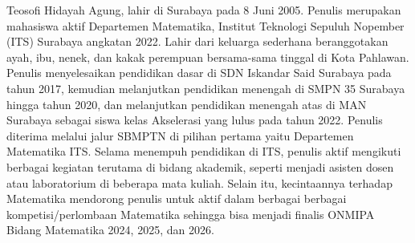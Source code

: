 Teosofi Hidayah Agung, lahir di Surabaya pada 8 Juni 2005. Penulis merupakan mahasiswa aktif Departemen Matematika, Institut Teknologi Sepuluh Nopember (ITS) Surabaya angkatan 2022. Lahir dari keluarga sederhana beranggotakan ayah, ibu, nenek, dan kakak perempuan bersama-sama tinggal di Kota Pahlawan. Penulis menyelesaikan pendidikan dasar di SDN Iskandar Said Surabaya pada tahun 2017, kemudian melanjutkan pendidikan menengah di SMPN 35 Surabaya hingga tahun 2020, dan melanjutkan pendidikan menengah atas di MAN Surabaya sebagai siswa kelas Akselerasi yang lulus pada tahun 2022. Penulis diterima melalui jalur SBMPTN di pilihan pertama yaitu Departemen Matematika ITS. Selama menempuh pendidikan di ITS, penulis aktif mengikuti berbagai kegiatan terutama di bidang akademik, seperti menjadi asisten dosen atau laboratorium di beberapa mata kuliah. Selain itu, kecintaannya terhadap Matematika mendorong penulis untuk aktif dalam berbagai berbagai kompetisi/perlombaan Matematika sehingga bisa menjadi finalis ONMIPA Bidang Matematika 2024, 2025, dan 2026.